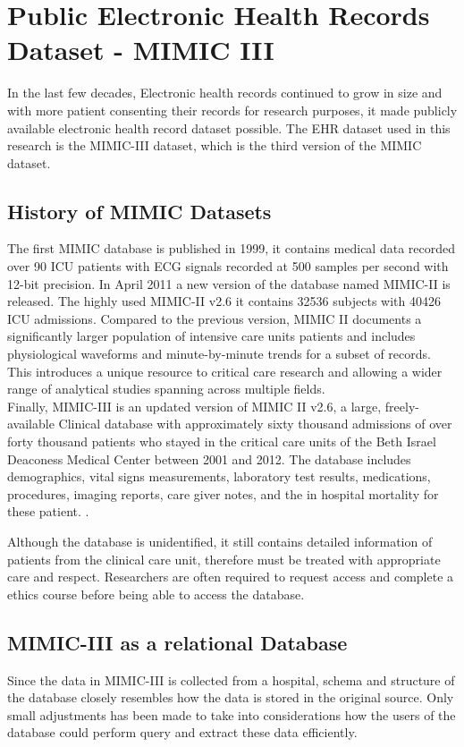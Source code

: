 \documentclass{l4proj}
\begin{document}
\section{Public Electronic Health Records Dataset - MIMIC III} 

In the last few decades, Electronic health records continued to grow in size and with more patient consenting their records for research purposes, it made publicly available electronic health record dataset possible. The EHR dataset used in this research is the MIMIC-III dataset, which is the third version of the MIMIC dataset.

\subsection{History of MIMIC Datasets}
    The first MIMIC database is published in 1999, it contains medical data recorded over 90 ICU patients with ECG signals recorded at 500 samples per second with 12-bit precision. In April 2011 a new version of the database named MIMIC-II is released. The highly used MIMIC-II v2.6 it contains 32536 subjects with 40426 ICU admissions. Compared to the previous version, MIMIC II documents a significantly larger population of intensive care units patients and includes physiological waveforms and minute-by-minute trends for a subset of records. This introduces a unique resource to critical care research and allowing a wider range of analytical studies spanning across multiple fields. \\
    Finally, MIMIC-III is an updated version of MIMIC II v2.6, a large, freely-available Clinical database with approximately sixty thousand admissions of over forty thousand patients who stayed in the critical care units of the Beth Israel Deaconess Medical Center between 2001 and 2012. The database includes demographics, vital signs measurements, laboratory test results, medications, procedures, imaging reports, care giver notes, and the in hospital mortality for these patient. \cite{PhysioNet_MIMIC-III}. 
    
    
    Although the database is unidentified, it still contains detailed information of patients from the clinical care unit, therefore must be treated with appropriate care and respect. Researchers are often required to request access and complete a ethics course before being able to access the database.
    
    
\subsection{MIMIC-III as a relational Database}
    Since the data in MIMIC-III is collected from a hospital, schema and structure of the database closely resembles how the data is stored in the original source. Only small adjustments has been made to take into considerations how the users of the database could perform query and extract these data efficiently.
\end{document}
